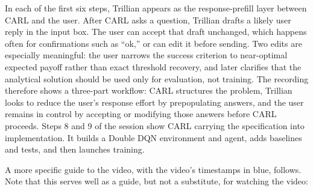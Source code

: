 \documentclass[mnsc,sglanonrev]{informs4}
\begin{document}
In each of the first six steps, Trillian appears as the response-prefill layer between CARL and the user. After CARL asks a question, Trillian drafts a likely user reply in the input box. The user can accept that draft unchanged, which happens often for confirmations such as ``ok,'' or can edit it before sending. Two edits are especially meaningful: the user narrows the success criterion to near-optimal expected payoff rather than exact threshold recovery, and later clarifies that the analytical solution should be used only for evaluation, not training. The recording therefore shows a three-part workflow: CARL structures the problem, Trillian looks to reduce the user's response effort by prepopulating answers, and the user remains in control by accepting or modifying those answers before CARL proceeds. Steps 8 and 9 of the session show CARL carrying the specification into implementation. It builds a Double DQN environment and agent, adds baselines and tests, and then launches training. 

A more specific guide to the video, with the video's timestamps in blue, follows. Note that this serves well as a guide, but not a substitute, for watching the video:
\end{document}
